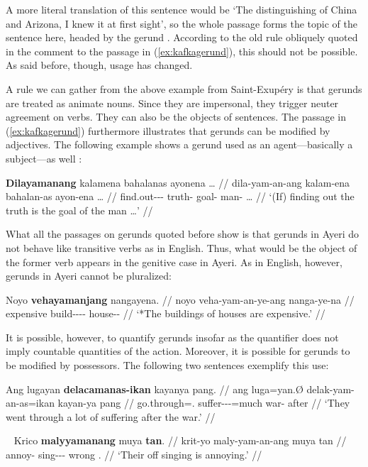 A more literal translation of this sentence would be `The distinguishing of
China and Arizona, I knew it at first sight', so the whole passage
 forms the topic of the
sentence here, headed by the gerund
. According to the old rule
obliquely quoted in the comment to the passage in (\ref{ex:kafkagerund}), this
should not be possible. As said before, though, usage has changed.

A rule we can gather from the above example from Saint-Exupéry is that gerunds
are treated as animate nouns. Since they are impersonal, they trigger neuter
agreement on verbs. They can also be the objects of sentences. The passage in
(\ref{ex:kafkagerund}) furthermore illustrates that gerunds can be modified by
adjectives. The following example shows a gerund used as an agent---basically a
subject---as well \citep{benung:scientificmethod}:

\ex\label{ex:scimethgerund}\begingl
	\gla \textbf{Dilayamanang} kalamena bahalanas ayonena … //
	\glb dila-yam-an-ang kalam-ena bahalan-as ayon-ena … //
	\glc find.out-\Ptcp{}-\Nmlz{}-\Aarg{} truth-\Gen{} goal-\Parg{} 
		man-\Gen{} … //
	\glft `(If) finding out the truth is the goal of the man …' //
\endgl\xe

What all the passages on gerunds quoted before show is that gerunds in Ayeri do
not behave like transitive verbs as in English. Thus, what would be the object
of the former verb appears in the genitive case in Ayeri. As in English,
however, gerunds in Ayeri cannot be pluralized:

\ex\ljudge* \begingl
	\gla Noyo \textbf{vehayamanjang} nangayena. //
	\glb noyo veha-yam-an-ye-ang nanga-ye-na //
	\glc expensive build-\Ptcp{}-\Nmlz{}-\Pl{}-\Aarg{} house-\Pl{}-\Gen{} //
	\glft `*The buildings of houses are expensive.' //
\endgl\xe

It is possible, however, to quantify gerunds insofar as the quantifier does not
imply countable quantities of the action. Moreover, it is possible for gerunds
to be modified by possessors. The following two sentences exemplify this use:

\ex\begingl
	\gla Ang lugayan \textbf{delacamanas-ikan} kayanya pang. //
	\glb ang luga=yan.Ø delak-yam-an-as=ikan kayan-ya pang //
	\glc \AgtT{} go.through=\TplM{}.\Top{} 
		suffer-\Ptcp{}-\Nmlz{}-\Parg{}=much war-\Loc{} after //
	\glft `They went through a lot of suffering after the war.' //
\endgl\xe

\ex~\begingl
	\gla Krico \textbf{malyyamanang} muya \textbf{tan}. //
	\glb krit-yo maly-yam-an-ang muya tan //
	\glc annoy-\TsgN{} sing-\Ptcp{}-\Nmlz{}-\Aarg{} wrong \TplM{}.\Gen{} //
	\glft `Their off singing is annoying.' //
\endgl\xe

